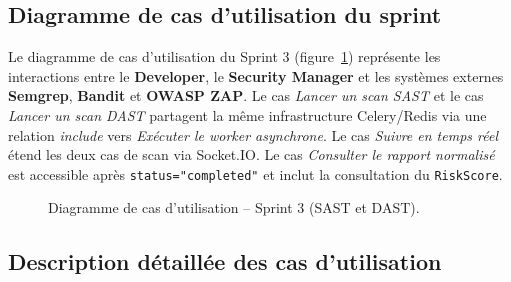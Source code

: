 \subsection{Diagramme de cas d'utilisation du sprint}

Le diagramme de cas d'utilisation du Sprint 3 (figure~\ref{fig:sprint3-use-case}) représente les interactions entre le \textbf{Developer}, le \textbf{Security Manager} et les systèmes externes \textbf{Semgrep}, \textbf{Bandit} et \textbf{OWASP ZAP}. Le cas \textit{Lancer un scan SAST} et le cas \textit{Lancer un scan DAST} partagent la même infrastructure Celery/Redis via une relation \textit{include} vers \textit{Exécuter le worker asynchrone}. Le cas \textit{Suivre en temps réel} étend les deux cas de scan via Socket.IO. Le cas \textit{Consulter le rapport normalisé} est accessible après \texttt{status="completed"} et inclut la consultation du \texttt{RiskScore}.

\begin{figure}[H]
\centering
\fbox{\rule{0pt}{2in}\rule{0.9\linewidth}{0pt}}
\caption{Diagramme de cas d'utilisation -- Sprint 3 (SAST et DAST).}
\label{fig:sprint3-use-case}
\end{figure}

\subsection{Description détaillée des cas d'utilisation}

